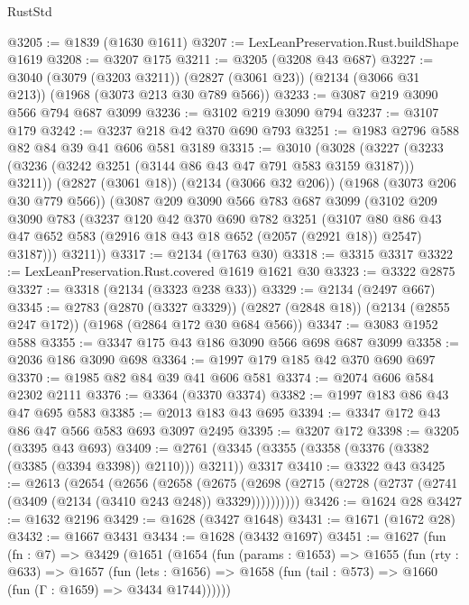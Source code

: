 \begin{lexlean}{RustStd}
\begin{coremodule}
@3205 := @1839 (@1630 @1611)
@3207 := LexLeanPreservation.Rust.buildShape @1619
@3208 := @3207 @175
@3211 := @3205 (@3208 @43 @687)
@3227 := @3040
    (@3079 (@3203 @3211))
    (@2827 (@3061 @23))
    (@2134 (@3066 @31 @213))
    (@1968 (@3073 @213 @30 @789 @566))
@3233 := @3087 @219 @3090 @566 @794 @687 @3099
@3236 := @3102 @219 @3090 @794
@3237 := @3107 @179
@3242 := @3237 @218 @42 @370 @690 @793
@3251 := @1983 @2796 @588 @82 @84 @39 @41 @606 @581 @3189
@3315 := @3010
    (@3028
      (@3227 (@3233 (@3236 (@3242 @3251 (@3144 @86 @43 @47 @791 @583 @3159 @3187))) @3211))
      (@2827 (@3061 @18))
      (@2134 (@3066 @32 @206))
      (@1968 (@3073 @206 @30 @779 @566))
      (@3087
        @209
        @3090
        @566
        @783
        @687
        @3099
        (@3102
          @209
          @3090
          @783
          (@3237
            @120
            @42
            @370
            @690
            @782
            @3251
            (@3107
              @80
              @86
              @43
              @47
              @652
              @583
              (@2916 @18 @43 @18 @652 (@2057 (@2921 @18)) @2547)
              @3187)))
        @3211))
@3317 := @2134 (@1763 @30)
@3318 := @3315 @3317
@3322 := LexLeanPreservation.Rust.covered @1619 @1621 @30
@3323 := @3322 @2875
@3327 := @3318 (@2134 (@3323 @238 @33))
@3329 := @2134 (@2497 @667)
@3345 := @2783
    (@2870 (@3327 @3329))
    (@2827 (@2848 @18))
    (@2134 (@2855 @247 @172))
    (@1968 (@2864 @172 @30 @684 @566))
@3347 := @3083 @1952 @588
@3355 := @3347 @175 @43 @186 @3090 @566 @698 @687 @3099
@3358 := @2036 @186 @3090 @698
@3364 := @1997 @179 @185 @42 @370 @690 @697
@3370 := @1985 @82 @84 @39 @41 @606 @581
@3374 := @2074 @606 @584 @2302 @2111
@3376 := @3364 (@3370 @3374)
@3382 := @1997 @183 @86 @43 @47 @695 @583
@3385 := @2013 @183 @43 @695
@3394 := @3347 @172 @43 @86 @47 @566 @583 @693 @3097 @2495
@3395 := @3207 @172
@3398 := @3205 (@3395 @43 @693)
@3409 := @2761 (@3345 (@3355 (@3358 (@3376 (@3382 (@3385 (@3394 @3398)) @2110))) @3211)) @3317
@3410 := @3322 @43
@3425 := @2613
    (@2654
      (@2656
        (@2658
          (@2675 (@2698 (@2715 (@2728 (@2737 (@2741 (@3409 (@2134 (@3410 @243 @248)) @3329))))))))))
@3426 := @1624 @28
@3427 := @1632 @2196
@3429 := @1628 (@3427 @1648)
@3431 := @1671 (@1672 @28)
@3432 := @1667 @3431
@3434 := @1628 (@3432 @1697)
@3451 := @1627
    (fun (fn : @7) =>
    @3429
      (@1651
        (@1654
          (fun (params : @1653) =>
          @1655
            (fun (rty : @633) =>
            @1657
              (fun (lets : @1656) =>
              @1658 (fun (tail : @573) => @1660 (fun (Γ : @1659) => @3434 @1744))))))

\end{coremodule}
\end{lexlean}
